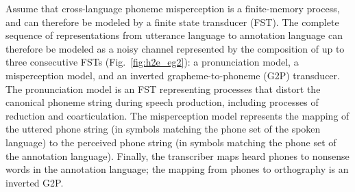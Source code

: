 Assume that cross-language phoneme misperception is a finite-memory
process, and can therefore be modeled by a finite state transducer
(FST).  The complete sequence of representations from utterance
language to annotation language can therefore be modeled as a noisy
channel represented by the composition of up to three consecutive FSTs
(Fig.~\ref{fig:h2e_eg2}): a pronunciation model, a misperception
model, and an inverted grapheme-to-phoneme (G2P) transducer.  The
pronunciation model is an FST representing processes that distort the
canonical phoneme string during speech production, including processes
of reduction and coarticulation.  The misperception model represents
the mapping of the uttered phone string (in symbols matching the
phone set of the spoken language) to the perceived phone string (in
symbols matching the phone set of the annotation language).  Finally,
the transcriber maps heard phones to nonsense words in the annotation
language; the mapping from phones to orthography is an inverted G2P.


